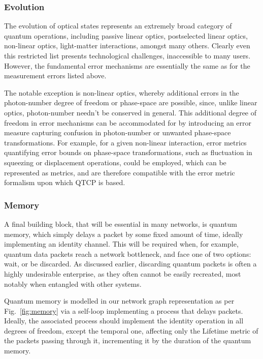 \documentclass[aps,rmp,twocolumn,amsmath,amssymb,nofootinbib,superscriptaddress]{revtex4}
\begin{document}
%
%

\subsubsection{Evolution}

The evolution of optical states represents an extremely broad category of quantum operations, including passive linear optics, postselected linear optics, non-linear optics, light-matter interactions, amongst many others. Clearly even this restricted list presents technological challenges, inaccessible to many users. However, the fundamental error mechanisms are essentially the same as for the measurement errors listed above.

The notable exception is non-linear optics, whereby additional errors in the photon-number degree of freedom or phase-space are possible, since, unlike linear optics, photon-number needn't be conserved in general. This additional degree of freedom in error mechanisms can be accommodated for by introducing an error measure capturing confusion in photon-number or unwanted phase-space transformations. For example, for a given non-linear interaction, error metrics quantifying error bounds on phase-space transformations, such as fluctuation in squeezing or displacement operations, could be employed, which can be represented as metrics, and are therefore compatible with the error metric formalism upon which QTCP is based.

%
%

\subsubsection{Memory} \label{sec:memory}

A final building block, that will be essential in many networks, is quantum memory, which simply delays a packet by some fixed amount of time, ideally implementing an identity channel. This will be required when, for example, quantum data packets reach a network bottleneck, and face one of two options: wait, or be discarded. As discussed earlier, discarding quantum packets is often a highly undesirable enterprise, as they often cannot be easily recreated, most notably when entangled with other systems.

Quantum memory is modelled in our network graph representation as per Fig.~\ref{fig:memory} via a self-loop implementing a process that delays packets. Ideally, the associated process should implement the identity operation in all degrees of freedom, except the temporal one, affecting only the {\sc Lifetime} metric of the packets passing through it, incrementing it by the duration of the quantum memory.
\end{document}
